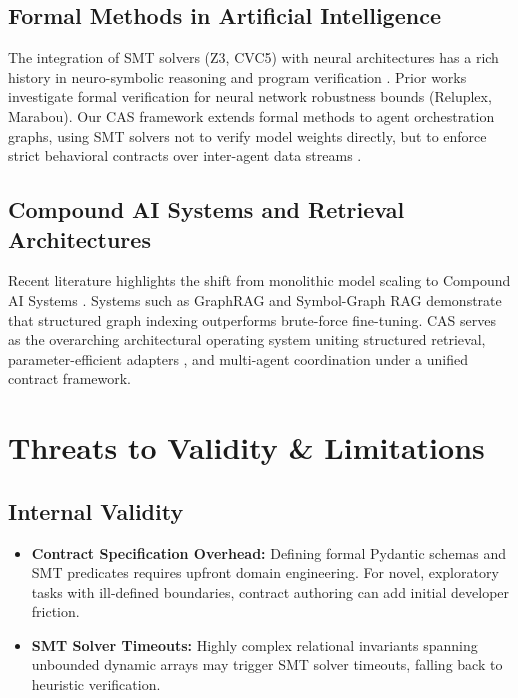 \documentclass[10pt,twocolumn,letterpaper]{article}
\begin{document}
\subsection{Formal Methods in Artificial Intelligence}

The integration of SMT solvers (Z3, CVC5) with neural architectures has a rich history in neuro-symbolic reasoning and program verification \cite{crossref_10_18653_v1_2026_findings_acl_1933}. Prior works investigate formal verification for neural network robustness bounds (Reluplex, Marabou). Our CAS framework extends formal methods to agent orchestration graphs, using SMT solvers not to verify model weights directly, but to enforce strict behavioral contracts over inter-agent data streams \cite{arxiv_2404_01131}.


\subsection{Compound AI Systems and Retrieval Architectures}

Recent literature highlights the shift from monolithic model scaling to Compound AI Systems \cite{arxiv_2406_00584,arxiv_2005_14165}. Systems such as GraphRAG \cite{crossref_10_1145_3689096_3689462} and Symbol-Graph RAG demonstrate that structured graph indexing outperforms brute-force fine-tuning. CAS serves as the overarching architectural operating system uniting structured retrieval, parameter-efficient adapters \cite{arxiv_2305_18290}, and multi-agent coordination under a unified contract framework.




\section{Threats to Validity \& Limitations}



\subsection{Internal Validity}

\begin{itemize}
  \item \textbf{Contract Specification Overhead:} Defining formal Pydantic schemas and SMT predicates requires upfront domain engineering. For novel, exploratory tasks with ill-defined boundaries, contract authoring can add initial developer friction.
  \item \textbf{SMT Solver Timeouts:} Highly complex relational invariants spanning unbounded dynamic arrays may trigger SMT solver timeouts, falling back to heuristic verification.
\end{itemize}
\end{document}
